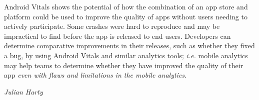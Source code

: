 Android Vitals shows the potential of how the combination of an app store and platform could be used to improve the quality of apps without users needing to actively participate. Some crashes were hard to reproduce and may be impractical to find before the app is released to end users. Developers can determine comparative improvements in their releases, such as whether they fixed a bug, by using Android Vitals and similar analytics tools; \textit{i.e.} mobile analytics may help teams to determine whether they have improved the quality of their app \textit{even with flaws and limitations in the mobile analytics}.

\begin{flushright}
	\textit{Julian Harty}
\end{flushright}



